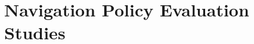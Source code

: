 \chapter{Navigation Policy Evaluation Studies}
\label{chap:7_navigation_policy_evaluation_studies}

\begin{comment}
Evaluation without Obstacles
Evaluation with sparse obstacles out of the way
Evaluation when obstacle avoidance is necessary

For each
2-3 qualitative results (maps, path, actions vel ref)
statistical study with randomized  - numbers of times it crashes
\end{comment}
